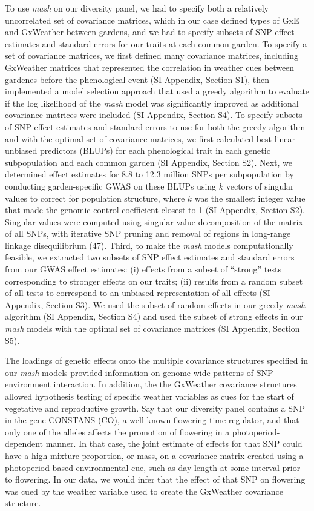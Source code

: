 \documentclass[
  9pt,
  twocolumn,
  twoside]{pnas-new}
\begin{document}
To use \emph{mash} on our diversity panel, we had to specify both a
relatively uncorrelated set of covariance matrices, which in our case
defined types of GxE and GxWeather between gardens, and we had to
specify subsets of SNP effect estimates and standard errors for our
traits at each common garden. To specify a set of covariance matrices,
we first defined many covariance matrices, including GxWeather matrices
that represented the correlation in weather cues between gardenes before
the phenological event (SI Appendix, Section S1), then implemented a
model selection approach that used a greedy algorithm to evaluate if the
log likelihood of the \emph{mash} model was significantly improved as
additional covariance matrices were included (SI Appendix, Section S4).
To specify subsets of SNP effect estimates and standard errors to use
for both the greedy algorithm and with the optimal set of covariance
matrices, we first calculated best linear unbiased predictors (BLUPs)
for each phenological trait in each genetic subpopulation and each
common garden (SI Appendix, Section S2). Next, we determined effect
estimates for 8.8 to 12.3 million SNPs per subpopulation by conducting
garden-specific GWAS on these BLUPs using \(k\) vectors of singular
values to correct for population structure, where \(k\) was the smallest
integer value that made the genomic control coefficient closest to 1 (SI
Appendix, Section S2). Singular values were computed using singular
value decomposition of the matrix of all SNPs, with iterative SNP
pruning and removal of regions in long-range linkage disequilibrium
(47). Third, to make the \emph{mash} models computationally feasible, we
extracted two subsets of SNP effect estimates and standard errors from
our GWAS effect estimates: (i) effects from a subset of ``strong'' tests
corresponding to stronger effects on our traits; (ii) results from a
random subset of all tests to correspond to an unbiased representation
of all effects (SI Appendix, Section S3). We used the subset of random
effects in our greedy \emph{mash} algorithm (SI Appendix, Section S4)
and used the subset of strong effects in our \emph{mash} models with the
optimal set of covariance matrices (SI Appendix, Section S5).

The loadings of genetic effects onto the multiple covariance structures
specified in our \emph{mash} models provided information on genome-wide
patterns of SNP-environment interaction. In addition, the the GxWeather
covariance structures allowed hypothesis testing of specific weather
variables as cues for the start of vegetative and reproductive growth.
Say that our diversity panel contains a SNP in the gene CONSTANS (CO), a
well-known flowering time regulator, and that only one of the alleles
affects the promotion of flowering in a photoperiod-dependent manner. In
that case, the joint estimate of effects for that SNP could have a high
mixture proportion, or mass, on a covariance matrix created using a
photoperiod-based environmental cue, such as day length at some interval
prior to flowering. In our data, we would infer that the effect of that
SNP on flowering was cued by the weather variable used to create the
GxWeather covariance structure.
\end{document}
